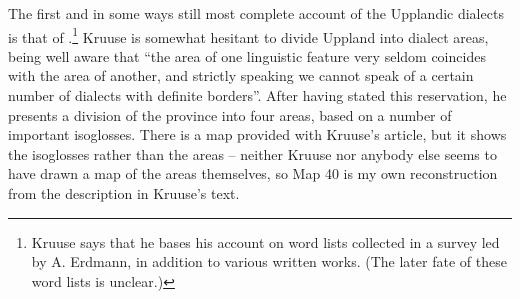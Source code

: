 
 The first and in some ways still most complete account of the Upplandic dialects is that of \citet{Kruuse1908}.\footnote{ Kruuse says that he bases his account on word lists collected in a survey led by A. Erdmann, in addition to various written works. (The later fate of these word lists is unclear.) } Kruuse is somewhat hesitant to divide Uppland into dialect areas, being well aware that “the area of one linguistic feature very seldom coincides with the area of another, and strictly speaking we cannot speak of a certain number of dialects with definite borders”. After having stated this reservation, he presents a division of the province into four areas, based on a number of important isoglosses. There is a map provided with Kruuse’s article, but it shows the isoglosses rather than the areas – neither Kruuse nor anybody else seems to have drawn a map of the areas themselves, so Map 40 is my own reconstruction from the description in Kruuse’s text. 


